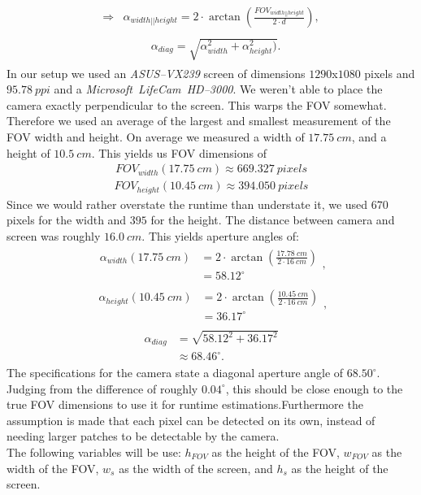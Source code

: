 \documentclass[journal,final,a4paper,twoside]{PS}
\begin{document}
\begin{align}\begin{split}
\Rightarrow &\alpha_{width||height} = 2 \cdot \arctan \left(\frac{FOV_{width||height }}{2\cdot d} \right),
\end{split}
\end{align}
\begin{align}\begin{split}
&\alpha_{diag} = \sqrt{\alpha_{width}^2 + \alpha_{height}^2)}.
\end{split}
\end{align}
In our setup we used an \emph{ASUS--VX239} screen of dimensions $1290$x$1080$ pixels and $95.78~ppi$ and a \emph{Microsoft~LifeCam~HD--3000}. We weren't able to place the camera exactly perpendicular to the screen. This warps the FOV somewhat. Therefore we used an average of the largest and smallest measurement of the FOV width and height. On average we measured a width of $17.75~cm$, and a height of $10.5~cm$. This yields us FOV dimensions of
\begin{align*}
FOV_{width}(17.75~cm) \approx 669.327~pixels
\end{align*}
\begin{align*}
FOV_{height}(10.45~cm) \approx 394.050~pixels
\end{align*}
Since we would rather overstate the runtime than understate it, we used $670$ pixels for the width and $395$ for the height. The distance between camera and screen was roughly $16.0~cm$. This yields aperture angles of:
\begin{align}\begin{split}
\alpha_{width}(17.75~cm)&= 2 \cdot \arctan\left(\frac{17.78~cm}{2 \cdot 16~cm}\right) \\&= 58.12^{\circ}\end{split},
\end{align}
\begin{align}\begin{split}
\alpha_{height}(10.45~cm) &= 2 \cdot\arctan\left(\frac{10.45~cm}{2 \cdot 16~cm}\right) \\&= 36.17^{\circ}\end{split},
\end{align}
\begin{align}\begin{split}
\alpha_{diag} &= \sqrt{58.12^2 + 36.17^2} \\& \approx 68.46^{\circ}.\end{split}
\end{align}
The specifications for the camera state a diagonal aperture angle of $68.50^{\circ}$. Judging from the difference of roughly $0.04^{\circ}$, this should be close enough to the true FOV dimensions to use it for runtime estimations.Furthermore the assumption is made that each pixel can be detected on its own, instead of needing larger patches to be detectable by the camera.\\
The following variables will be use: $h_{FOV}$ as the height of the FOV, $w_{FOV}$ as the width of the FOV, $w_s$ as the width of the screen, and $h_s$ as the height of the screen.\\
\end{document}
